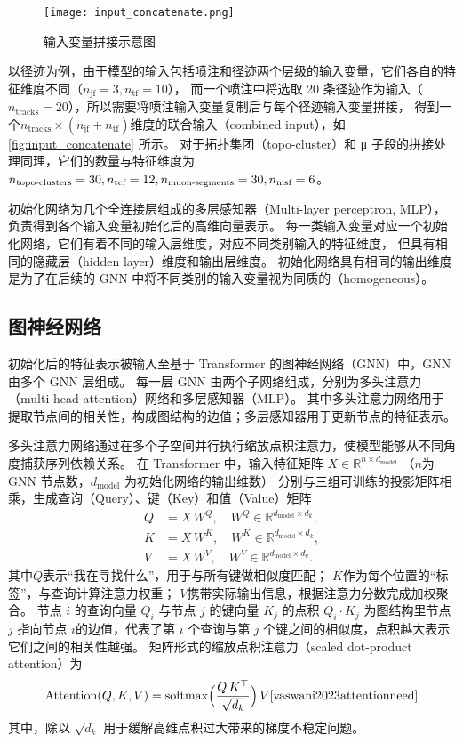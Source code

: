 \begin{figure}[ht]
    \centering
    \texttt{[image: input\_concatenate.png]}
    \caption{输入变量拼接示意图}
    \label{fig:input_concatenate}
\end{figure}

以径迹为例，由于模型的输入包括喷注和径迹两个层级的输入变量，它们各自的特征维度不同（$n_\text{jf}=3, n_\text{tf}=10$），
而一个喷注中将选取 20 条径迹作为输入（$n_\text{tracks}=20$），所以需要将喷注输入变量复制后与每个径迹输入变量拼接，
得到一个$n_\text{tracks} \times (n_\text{jf} + n_\text{tf})$维度的联合输入（combined input），如\autoref{fig:input_concatenate} 所示。
对于拓扑集团（topo-cluster）和 μ 子段的拼接处理同理，它们的数量与特征维度为
$n_\text{topo-clusters} = 30, n_\text{tcf}=12, n_\text{muon-segments}=30, n_\text{msf}=6$。

初始化网络为几个全连接层组成的多层感知器（Multi-layer perceptron, MLP），负责得到各个输入变量初始化后的高维向量表示。
每一类输入变量对应一个初始化网络，它们有着不同的输入层维度，对应不同类别输入的特征维度，
但具有相同的隐藏层（hidden layer）维度和输出层维度。
初始化网络具有相同的输出维度是为了在后续的 GNN 中将不同类别的输入变量视为同质的（homogeneous）。


\subsection{图神经网络}
初始化后的特征表示被输入至基于 Transformer 的图神经网络（GNN）中，GNN 由多个 GNN 层组成。
每一层 GNN 由两个子网络组成，分别为多头注意力（multi-head attention）网络和多层感知器（MLP）。
其中多头注意力网络用于提取节点间的相关性，构成图结构的边值；多层感知器用于更新节点的特征表示。

多头注意力网络通过在多个子空间并行执行缩放点积注意力，使模型能够从不同角度捕获序列依赖关系。
在 Transformer 中，输入特征矩阵 ${X}\in\mathbb{R}^{n\times d_{\mathrm{model}}}$
（$n$为 GNN 节点数，$d_{\mathrm{model}}$ 为初始化网络的输出维数）
分别与三组可训练的投影矩阵相乘，生成查询（Query）、键（Key）和值（Value）矩阵
\begin{align}
    {Q} & = {X}\,W^Q, \quad W^Q \in\mathbb{R}^{d_{\mathrm{model}}\times d_k}, \\
    {K} & = {X}\,W^K, \quad W^K \in\mathbb{R}^{d_{\mathrm{model}}\times d_k}, \\
    {V} & = {X}\,W^V, \quad W^V \in\mathbb{R}^{d_{\mathrm{model}}\times d_v}.
\end{align}
其中${Q}$表示“我在寻找什么”，用于与所有键做相似度匹配；
${K}$作为每个位置的“标签”，与查询计算注意力权重；
${V}$携带实际输出信息，根据注意力分数完成加权聚合。
节点 $i$ 的查询向量 ${Q}_i$ 与节点 $j$ 的键向量 ${K}_j$ 的点积 ${Q}_i \cdot {K}_j$
为图结构里节点 $j$ 指向节点 $i$的边值，代表了第 $i$ 个查询与第 $j$ 个键之间的相似度，点积越大表示它们之间的相关性越强。
矩阵形式的缩放点积注意力（scaled dot-product attention）为
\begin{align}
    \mathrm{Attention}({Q},{K},{V})
    = \mathrm{softmax} \Bigl(\frac{{Q}\,{K}^\top}{\sqrt{d_k}}\Bigr)\,{V}
    \cite{vaswani2023attentionneed}
\end{align}
其中，除以 $\sqrt{d_k}$ 用于缓解高维点积过大带来的梯度不稳定问题。

